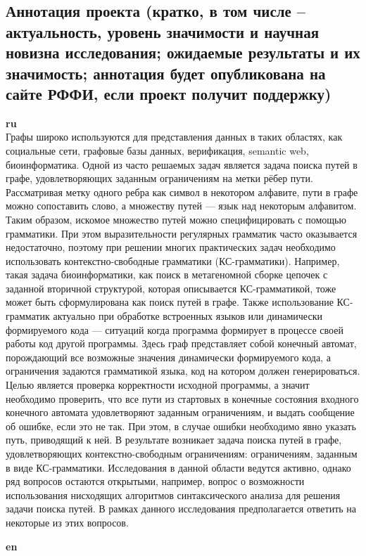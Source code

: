 \documentclass[12pt]{article}  %
\theoremstyle{remark}
\begin{document}
\subsection{Аннотация проекта (кратко, в том числе – актуальность, уровень значимости и научная новизна исследования; ожидаемые результаты и их значимость; аннотация будет опубликована на сайте РФФИ, если проект получит поддержку)}

\textbf{ru}\\
Графы широко используются для представления данных в таких областях, как социальные сети, графовые базы данных, верификация, semantic web, биоинформатика. Одной из часто решаемых задач является задача поиска путей в графе, удовлетворяющих заданным ограничениям на метки рёбер пути. Рассматривая метку одного ребра как символ в некотором алфавите, пути в графе можно сопоставить слово, а множеству путей — язык над некоторым алфавитом. Таким образом, искомое множество путей можно специфицировать с помощью грамматики. При этом выразительности регулярных грамматик часто оказывается недостаточно, поэтому при решении многих практических задач необходимо использовать контекстно-свободные грамматики (КС-грамматики). Например, такая задача биоинформатики, как поиск в метагеномной сборке цепочек с заданной вторичной структурой, которая описывается КС-грамматикой, тоже может быть сформулирована как поиск путей в графе. Также использование КС-грамматик актуально при обработке встроенных языков или динамически формируемого кода — ситуаций когда программа формирует в процессе своей работы код другой программы. Здесь граф представляет собой конечный автомат, порождающий все возможные значения динамически формируемого кода, а ограничения задаются грамматикой языка, код на котором должен генерироваться. Целью является проверка корректности исходной программы, а значит необходимо проверить, что все пути из стартовых в конечные состояния входного конечного автомата удовлетворяют заданным ограничениям, и выдать сообщение об ошибке, если это не так. При этом, в случае ошибки необходимо явно указать путь, приводящий к ней. В результате возникает задача поиска путей в графе, удовлетворяющих контекстно-свободным ограничениям: ограничениям, заданным в виде КС-грамматики. Исследования в данной области ведутся активно, однако ряд вопросов остаются открытыми, например, вопрос о возможности использования нисходящих алгоритмов синтаксического анализа для решения задачи поиска путей. В рамках данного исследования предполагается ответить на некоторые из этих вопросов.


\textbf{en}\\
\end{document}
